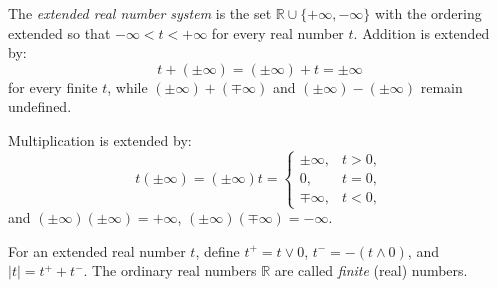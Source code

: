 The \textit{extended real number system} is the set $\mathbb{R} \cup \{+\infty, -\infty\}$ with the ordering extended so that $-\infty < t < +\infty$ for every real number $t$. Addition is extended by:
$$t + (\pm \infty) = (\pm \infty) + t = \pm \infty$$
for every finite $t$, while $(\pm \infty) + (\mp \infty)$ and $(\pm \infty) - (\pm \infty)$ remain undefined.

Multiplication is extended by:
$$t(\pm \infty) = (\pm \infty)t = \begin{cases} \pm \infty, & t > 0, \\ 0, & t = 0, \\ \mp \infty, & t < 0, \end{cases}$$
and $(\pm \infty)(\pm \infty) = +\infty$, $(\pm \infty)(\mp \infty) = -\infty$.

For an extended real number $t$, define $t^+ = t \lor 0$, $t^- = -(t \land 0)$, and $|t| = t^+ + t^-$. The ordinary real numbers $\mathbb{R}$ are called \textit{finite} (real) numbers.

